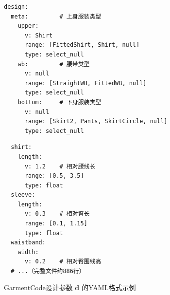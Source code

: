 \begin{figure}[t]
\centering
\begin{minipage}[t]{0.47\linewidth}
\begin{verbatim}
design:
  meta:         # 上身服装类型
    upper:
      v: Shirt
      range: [FittedShirt, Shirt, null]
      type: select_null
    wb:         # 腰带类型
      v: null
      range: [StraightWB, FittedWB, null]
      type: select_null
    bottom:     # 下身服装类型
      v: null
      range: [Skirt2, Pants, SkirtCircle, null]
      type: select_null
\end{verbatim}
\end{minipage}
\hfill
\begin{minipage}[t]{0.47\linewidth}
\begin{verbatim}
  shirt:      
    length:
      v: 1.2    # 相对腰线长
      range: [0.5, 3.5]
      type: float
  sleeve:
    length:
      v: 0.3    # 相对臂长
      range: [0.1, 1.15]
      type: float
  waistband: 
    width:
      v: 0.2    # 相对臀围线高
  # ...（完整文件约886行）
\end{verbatim}
\end{minipage}

\caption{GarmentCode设计参数 $\mathbf{d}$ 的YAML格式示例}
\label{fig:ch4-design-param}
\end{figure}
